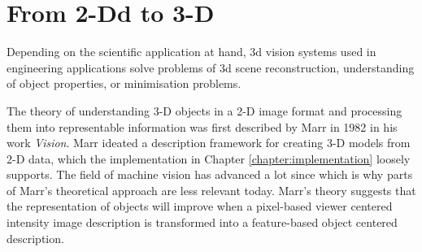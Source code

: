 \documentclass[12pt,a4paper,oneside,pdftex]{report}
\begin{document}
\section{From 2-Dd to 3-D}
\label{section:from_2d_to_3d}

Depending on the scientific application at hand, 3d vision systems used in engineering applications solve problems of 3d scene reconstruction, understanding of object properties, or minimisation problems\citep{Sonka07}. 


The theory of understanding 3-D objects in a 2-D image format and processing them into representable information was first described by Marr in 1982 in his work \emph{Vision}. Marr ideated a description framework for creating 3-D models from 2-D data, which the implementation in Chapter \ref{chapter:implementation} loosely supports. The field of machine vision has advanced a lot since which is why parts of Marr's theoretical approach are less relevant today. Marr's theory suggests that the representation of objects will improve when a pixel-based viewer centered intensity image description is transformed into a feature-based object centered description.


\end{document}
